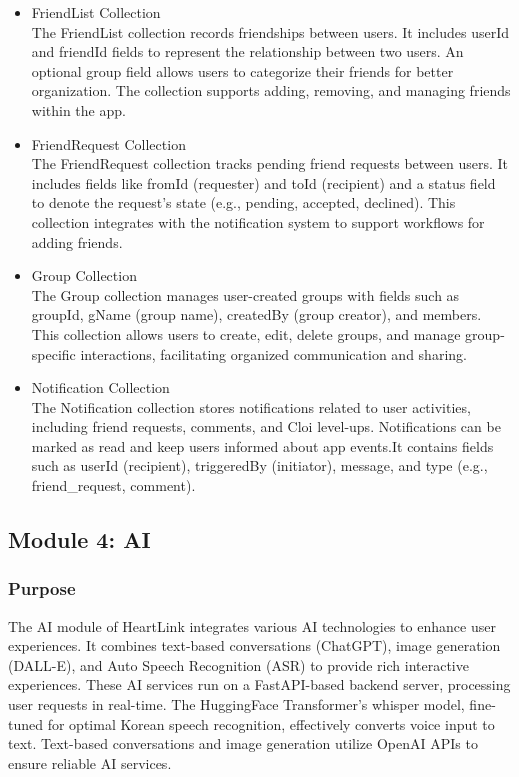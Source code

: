 \documentclass[conference]{IEEEtran}
\begin{document}
\begin{itemize}
                \vspace{3mm}                
                \item FriendList Collection\\
                The FriendList collection records friendships between users. It includes userId and friendId fields to represent the relationship between two users. An optional group field allows users to categorize their friends for better organization. The collection supports adding, removing, and managing friends within the app.
                \vspace{3mm}                
                \item FriendRequest Collection\\
                The FriendRequest collection tracks pending friend requests between users. It includes fields like fromId (requester) and toId (recipient) and a status field to denote the request's state (e.g., pending, accepted, declined). This collection integrates with the notification system to support workflows for adding friends.
                \vspace{3mm}                
                \item Group Collection\\
                The Group collection manages user-created groups with fields such as groupId, gName (group name), createdBy (group creator), and members. This collection allows users to create, edit, delete groups, and manage group-specific interactions, facilitating organized communication and sharing.
                \vspace{3mm}                
                \item Notification Collection\\
                The Notification collection stores notifications related to user activities, including friend requests, comments, and Cloi level-ups. Notifications can be marked as read and keep users informed about app events.It contains fields such as userId (recipient), triggeredBy (initiator), message, and type (e.g., friend_request, comment).
            \end{itemize}
    \subsection{Module 4: AI}
        \subsubsection{Purpose}
            The AI module of HeartLink integrates various AI technologies to enhance user experiences. It combines text-based conversations (ChatGPT), image generation (DALL-E), and Auto Speech Recognition (ASR) to provide rich interactive experiences. These AI services run on a FastAPI-based backend server, processing user requests in real-time. The HuggingFace Transformer's whisper model, fine-tuned for optimal Korean speech recognition, effectively converts voice input to text. Text-based conversations and image generation utilize OpenAI APIs to ensure reliable AI services.\\
            \vspace{3mm}
\end{document}

